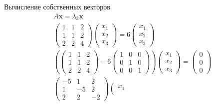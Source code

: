 \begin{frame}{Вычисление собственных векторов}
\[
    \begin{aligned}
        & A \mathbf{x}=\lambda_{3} \mathbf{x}\\
        &\left(\begin{array}{lll}
        1 & 1 & 2 \\
        1 & 1 & 2 \\
        2 & 2 & 4
        \end{array}\right)\left(\begin{array}{l}
        x_{1} \\
        x_{2} \\
        x_{3}
        \end{array}\right)=6\left(\begin{array}{l}
        x_{1} \\
        x_{2} \\
        x_{3}
        \end{array}\right) \\
        &\left(\left(\begin{array}{lll}
        1 & 1 & 2 \\
        1 & 1 & 2 \\
        2 & 2 & 4
        \end{array}\right)-6\left(\begin{array}{lll}
        1 & 0 & 0 \\
        0 & 1 & 0 \\
        0 & 0 & 1
        \end{array}\right)\right)\left(\begin{array}{l}
        x_{1} \\
        x_{2} \\
        x_{3}
        \end{array}\right)=
        \left(\begin{array}{l}
        0 \\
        0 \\
        0
        \end{array}\right) \\
        &\left(\begin{array}{rrr}
        -5 & 1 & 2 \\
        1 & -5 & 2 \\
        2 & 2 & -2
        \end{array}\right)\left(\begin{array}{l}
        x_{1} \\

\end{array}
\end{aligned}\]
\end{frame}
